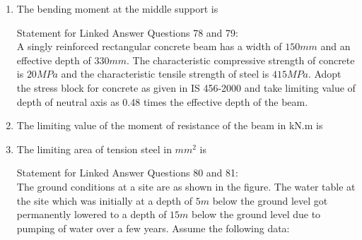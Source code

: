 \begin{enumerate}[start=74]
\item %
The bending moment at the middle support is 
\begin{enumerate}
\end{enumerate}
Statement for Linked Answer Questions 78 and 79:\\
A singly reinforced rectangular concrete beam has a width of $150 mm$ and an effective depth of $330 mm$. The characteristic compressive strength of concrete is $20 MPa$ and the characteristic tensile strength of steel is $415 MPa$. Adopt the stress block for concrete as given in IS 456-2000 and take limiting value of depth of neutral axis as 0.48 times the effective depth of the beam. 
\item %
The limiting value of the moment of resistance of the beam in kN.m is\\
\begin{enumerate}
\end{enumerate}
\item %
The limiting area of tension steel in $mm^2$ is 
\begin{enumerate}
\end{enumerate}
Statement for Linked Answer Questions 80 and 81:\\
The ground conditions at a site are as shown in the figure. The water table at the site which was initially at a depth of $5m$ below the ground level got permanently lowered to a depth of $15m$ below the ground level due to pumping of water over a few years. Assume the following data: \\

\end{enumerate}
